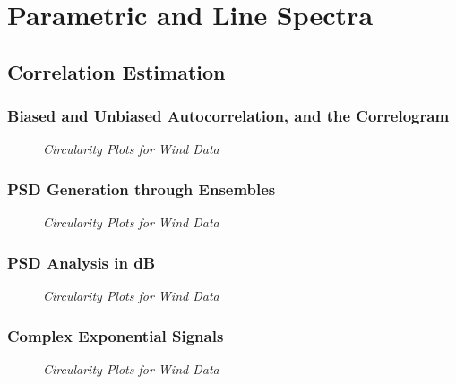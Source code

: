 \documentclass[./main.tex]{subfiles}
\begin{document}
\section{Parametric and Line Spectra}

\subsection{Correlation Estimation}

\subsubsection{Biased and Unbiased Autocorrelation, and the Correlogram}

\begin{figure}[h]
	\centering 
	\resizebox{\textwidth}{!}{}
	\caption{\textit{Circularity Plots for Wind Data}}
	\label{fig:2_1_a}
\end{figure}


\subsubsection{PSD Generation through Ensembles}

\begin{figure}[h]
	\centering 
	\resizebox{\textwidth}{!}{}
	\caption{\textit{Circularity Plots for Wind Data}}
	\label{fig:2_1_b}
\end{figure}

\subsubsection{PSD Analysis in dB}

\begin{figure}[h]
	\centering 
	\resizebox{\textwidth}{!}{}
	\caption{\textit{Circularity Plots for Wind Data}}
	\label{fig:2_1_c}
\end{figure}


\subsubsection{Complex Exponential Signals}

\begin{figure}[h]
	\centering 
	\resizebox{\textwidth}{!}{}
	\caption{\textit{Circularity Plots for Wind Data}}
	\label{fig:2_1_d_N}
\end{figure}
\end{document}
